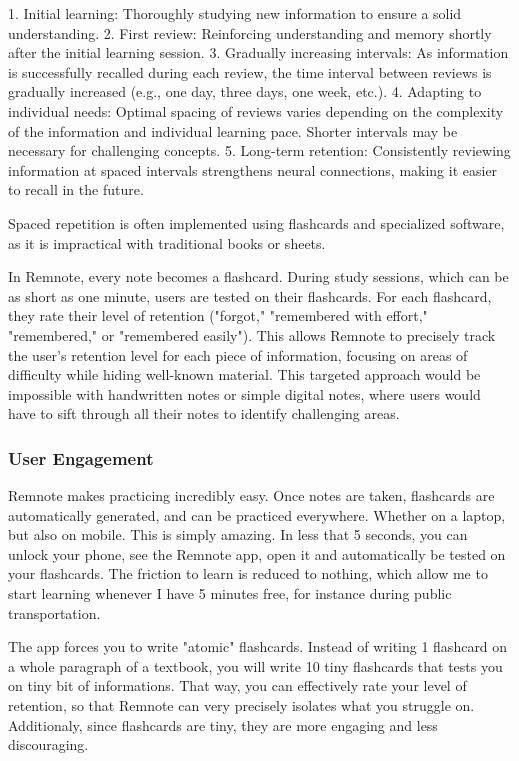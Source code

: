 \documentclass{article}
\begin{document}
1. Initial learning: Thoroughly studying new information to ensure a solid understanding.
2. First review: Reinforcing understanding and memory shortly after the initial learning session.
3. Gradually increasing intervals: As information is successfully recalled during each review, the time interval between reviews is gradually increased (e.g., one day, three days, one week, etc.).
4. Adapting to individual needs: Optimal spacing of reviews varies depending on the complexity of the information and individual learning pace. Shorter intervals may be necessary for challenging concepts.
5. Long-term retention: Consistently reviewing information at spaced intervals strengthens neural connections, making it easier to recall in the future.

Spaced repetition is often implemented using flashcards and specialized software, as it is impractical with traditional books or sheets.

In Remnote, every note becomes a flashcard. During study sessions, which can be as short as one minute, users are tested on their flashcards. For each flashcard, they rate their level of retention ("forgot," "remembered with effort," "remembered," or "remembered easily"). This allows Remnote to precisely track the user's retention level for each piece of information, focusing on areas of difficulty while hiding well-known material. This targeted approach would be impossible with handwritten notes or simple digital notes, where users would have to sift through all their notes to identify challenging areas.



\subsubsection{User Engagement}

Remnote makes practicing incredibly easy. Once notes are taken, flashcards are automatically generated, and can be practiced everywhere. Whether on a laptop, but also on mobile. This is simply amazing. In less that 5 seconds, you can unlock your phone, see the Remnote app, open it and automatically be tested on your flashcards. The friction to learn is reduced to nothing, which allow me to start learning whenever I have 5 minutes free, for instance during public transportation.

The app forces you to write "atomic" flashcards. Instead of writing 1 flashcard on a whole paragraph of a textbook, you will write 10 tiny flashcards that tests you on tiny bit of informations. That way, you can effectively rate your level of retention, so that Remnote can very precisely isolates what you struggle on. Additionaly, since flashcards are tiny, they are more engaging and less discouraging.
\end{document}
